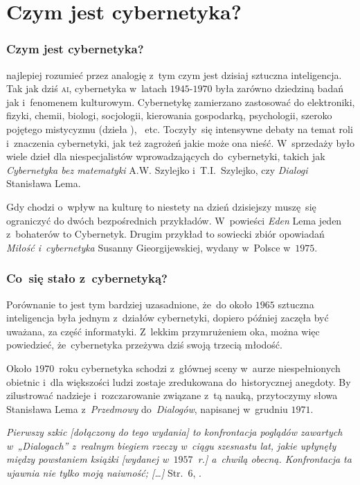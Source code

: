 \documentclass[10pt,t]{beamer}
\begin{document}
\section{Czym jest cybernetyka?}


\begin{frame}
  \frametitle{Czym jest cybernetyka?}


  najlepiej rozumieć przez analogię z~tym czym jest dzisiaj sztuczna
  inteligencja. Tak jak dziś \textsc{ai}, cybernetyka w~latach
  $1945\text{-}1970$ była zarówno dziedziną badań jak i~fenomenem
  kulturowym. Cybernetykę zamierzano zastosować do elektroniki, fizyki,
  chemii, biologi, socjologii, kierowania gospodarką, psychologii, szeroko
  pojętego mistycyzmu (dzieła
  ), ~etc. Toczyły~się intensywne debaty na temat roli i~znaczenia
  cybernetyki, jak też zagrożeń jakie może ona nieść. W~sprzedaży było
  wiele dzieł dla niespecjalistów wprowadzających do~cybernetyki, takich jak
  \textit{Cybernetyka bez matematyki} A.W. Szylejko i~T.I.~Szylejko, czy
  \textit{Dialogi} Stanisława Lema.

  Gdy chodzi o~wpływ na kulturę to niestety na dzień dzisiejszy muszę~się
  ograniczyć do dwóch bezpośrednich przykładów. W~powieści \textit{Eden}
  Lema jeden z~bohaterów to Cybernetyk. Drugim przykład to sowiecki zbiór
  opowiadań \textit{Miłość i~cybernetyka} Susanny Gieorgijewskiej, wydany
  w~Polsce w~$1975$.

\end{frame}





\begin{frame}
  \frametitle{Co~się stało z~cybernetyką?}


  Porównanie to jest tym bardziej uzasadnione, że~do około $1965$ sztuczna
  inteligencja była jednym z~działów cybernetyki, dopiero później
  zaczęła być uważana, za część informatyki. Z~lekkim przymrużeniem oka,
  można więc powiedzieć, że~cybernetyka przeżywa dziś swoją trzecią młodość.

  Około $1970$~roku cybernetyka schodzi z~głównej sceny w~aurze
  niespełnionych obietnic i~dla większości ludzi zostaje zredukowana
  do~historycznej anegdoty. By zilustrować nadzieje i~rozczarowanie związane
  z~tą nauką, przytoczymy słowa Stanisława Lema z~\textit{Przedmowy}
  do~\textit{Dialogów}, napisanej w~grudniu $1971$.

  \textit{Pierwszy szkic [dołączony do tego wydania] to konfrontacja
    poglądów zawartych w~„Dialogach” z~realnym biegiem rzeczy w~ciągu
    szesnastu lat, jakie upłynęły między powstaniem książki [wydanej
    w~$1957$~r.] a~chwilą obecną. Konfrontacja ta ujawnia nie
    tylko moją naiwność; [\ldots]}
  Str.~$6$, \parencite{Lem-Dialogi-Vol-I-Pub-1996}.

\end{frame}
\end{document}
